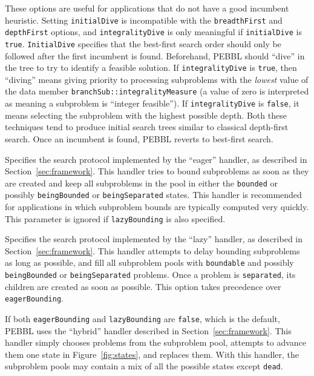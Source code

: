 \groupparams
{} 
These options are useful for
applications that do not have a good incumbent heuristic.  Setting
\texttt{initialDive} is incompatible with the \texttt{breadthFirst}
and \texttt{depthFirst} options, and \texttt{integralityDive} is only
meaningful if \texttt{initialDive} is \texttt{true}.
\texttt{InitialDive} specifies that the best-first search order should
only be followed after the first incumbent is found.  Beforehand,
PEBBL should ``dive'' in the tree to try to identify a feasible
solution.  If \texttt{integralityDive} is \texttt{true}, then
``diving'' means giving priority to processing subproblems with the
\emph{lowest} value of the data member
\texttt{branchSub::integralityMeasure} (a value of zero 
is interpreted as meaning a subproblem is
``integer feasible'').  If \texttt{integralityDive} is \texttt{false},
it means selecting the subproblem with the highest possible depth.
Both these techniques tend to produce initial search trees similar to
classical depth-first search.  Once an incumbent is found, PEBBL
reverts to best-first search.

Specifies the search protocol
implemented by the ``eager'' handler, as described in
Section~\ref{sec:framework}.  This handler tries to bound subproblems
as soon as they are created and keep all subproblems in the pool in
either the \texttt{bounded} or possibly \texttt{beingBounded} or
\texttt{beingSeparated} states.  This handler is recommended for
applications in which subproblem bounds are typically computed very
quickly.  This parameter is ignored if \texttt{lazyBounding} is also
specified.

Specifies the search protocol
implemented by the ``lazy'' handler, as described in
Section~\ref{sec:framework}.  This handler attempts to delay bounding
subproblems as long as possible, and fill all subproblem pools with
\texttt{boundable} and possibly \texttt{beingBounded} or
\texttt{beingSeparated} problems.  Once a problem is
\texttt{separated}, its children are created as soon
as possible.  This option takes precedence over
\texttt{eagerBounding}. 

\vspace{2ex}

If both \texttt{eagerBounding} and \texttt{lazyBounding} are
\texttt{\texttt{false}}, which is the default, PEBBL uses the ``hybrid''
handler described in Section~\ref{sec:framework}.  This handler simply
chooses problems from the subproblem pool, attempts to advance them
one state in Figure~\ref{fig:states}, and replaces them.  With this handler,
the subproblem pools may contain a mix of all the possible states
except \texttt{dead}.

